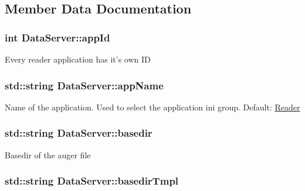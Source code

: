 \subsection{Member Data Documentation}
\hypertarget{classDataServer_a2336dffa57e35c69c5ae0927d5e9e052}{
\subsubsection[{app\-Id}]{\setlength{\rightskip}{0pt plus 5cm}int Data\-Server\-::app\-Id\hspace{0.3cm}{\ttfamily [private]}}}\label{classDataServer_a2336dffa57e35c69c5ae0927d5e9e052}
Every reader application has it's own I\-D \hypertarget{classDataServer_a8a26d65b11f0160c99cc00ab4a700a37}{
\subsubsection[{app\-Name}]{\setlength{\rightskip}{0pt plus 5cm}std\-::string Data\-Server\-::app\-Name\hspace{0.3cm}{\ttfamily [private]}}}\label{classDataServer_a8a26d65b11f0160c99cc00ab4a700a37}
Name of the application. Used to select the application ini group. Default\-: \hyperlink{classReader}{Reader} \hypertarget{classDataServer_a06a82d3d332afe39f6e56c9521abf5b1}{
\subsubsection[{basedir}]{\setlength{\rightskip}{0pt plus 5cm}std\-::string Data\-Server\-::basedir\hspace{0.3cm}{\ttfamily [private]}}}\label{classDataServer_a06a82d3d332afe39f6e56c9521abf5b1}
Basedir of the auger file \hypertarget{classDataServer_afdc8023d653417275c503ceef21d5b35}{
\subsubsection[{basedir\-Tmpl}]{\setlength{\rightskip}{0pt plus 5cm}std\-::string Data\-Server\-::basedir\-Tmpl\hspace{0.3cm}{\ttfamily [private]}}}\label{classDataServer_afdc8023d653417275c503ceef21d5b35}
